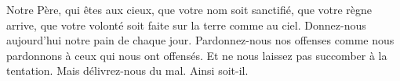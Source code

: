 Notre Père, qui êtes aux cieux,
que votre nom soit sanctifié, que votre règne arrive,
que votre volonté soit faite sur la terre comme au ciel.
Donnez-nous aujourd’hui notre pain de chaque jour.
Pardonnez-nous nos offenses comme nous pardonnons à ceux qui nous ont offensés.
Et ne nous laissez pas succomber à la tentation.
Mais délivrez-nous du mal.
Ainsi soit-il.